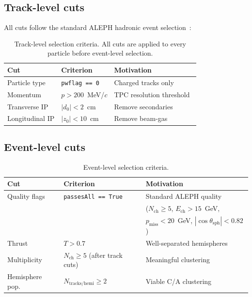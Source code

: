 \documentclass[11pt,a4paper]{article}
\begin{document}
\subsection{Track-level cuts}
\label{sec:track-cuts}

All cuts follow the standard ALEPH hadronic event
selection~\cite{ALEPH:1998vtv,ALEPH:1998hhr,ALEPH:1999rgl}:

\begin{table}[htbp]
\centering
\caption{Track-level selection criteria.  All cuts are applied to
  every particle before event-level selection.}
\label{tbl:track-cuts}
\begin{tabular}{lll}
\toprule
Cut & Criterion & Motivation \\
\midrule
Particle type & \texttt{pwflag == 0} & Charged tracks only \\
Momentum & $p > 200$~MeV/$c$ & TPC resolution threshold~\cite{ALEPH:1998hhr} \\
Transverse IP & $|d_0| < 2$~cm & Remove secondaries~\cite{ALEPH:1998vtv} \\
Longitudinal IP & $|z_0| < 10$~cm & Remove beam-gas~\cite{ALEPH:1998vtv} \\
\bottomrule
\end{tabular}
\end{table}

\subsection{Event-level cuts}
\label{sec:event-cuts}

\begin{table}[htbp]
\centering
\caption{Event-level selection criteria.}
\label{tbl:event-cuts}
\begin{tabular}{lll}
\toprule
Cut & Criterion & Motivation \\
\midrule
Quality flags & \texttt{passesAll == True} &
  Standard ALEPH quality \\
 & & ($N_\text{ch} \ge 5$, $E_\text{ch} > 15$~GeV, \\
 & & $p_\text{miss} < 20$~GeV, $|\cos\theta_\text{sph}| < 0.82$) \\
Thrust & $T > 0.7$ & Well-separated hemispheres \\
Multiplicity & $N_\text{ch} \ge 5$ (after track cuts) & Meaningful clustering \\
Hemisphere pop. & $N_\text{tracks/hemi} \ge 2$ & Viable C/A clustering \\
\bottomrule
\end{tabular}
\end{table}
\end{document}
